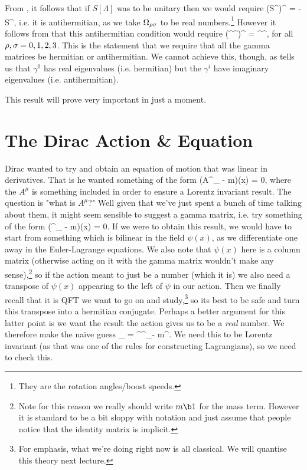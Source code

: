 \bq 
    From , it follows that if $S[\Lambda]$ was to be unitary then we would require 
    \bse 
        \big(S^{\rho\sig}\big)^{\dagger} = - S^{\rho\sig},
    \ese 
    i.e. it is antihermitian, as we take $\Omega_{\rho\sigma}$ to be real numbers.\footnote{They are the rotation angles/boost speeds.} However it follows from  that this antihermitian condition would require 
    \bse 
        \big(\gamma^{\rho}\gamma^{\sig}\big)^{\dagger} = \gamma^{\sig}\gamma^{\rho},
    \ese 
    for all $\rho,\sigma=0,1,2,3$. This is the statement that we require that all the gamma matrices be hermitian or antihermitian. We cannot achieve this, though, as  tells us that $\gamma^0$ has real eigenvalues (i.e. hermitian) but the $\gamma^i$ have imaginary eigenvalues (i.e. antihermitian). 
\eq 

This result will prove very important in just a moment. 

\section{The Dirac Action \& Equation}

Dirac wanted to try and obtain an equation of motion that was linear in derivatives. That is he wanted something of the form 
\bse 
    (A^{\mu}\p_{\mu} - m)\psi(x) = 0,
\ese
where the $A^{\mu}$ is something included in order to ensure a Lorentz invariant result. The question is "what is $A^{\mu}$?" Well given that we've just spent a bunch of time talking about them, it might seem sensible to suggest a gamma matrix, i.e. try something of the form 
\bse 
    (\gamma^{\mu}\p_{\mu} - m)\psi(x) = 0.
\ese
If we were to obtain this result, we would have to start from something which is bilinear in the field $\psi(x)$, as we differentiate one away in the Euler-Lagrange equations. We also note that $\psi(x)$ here is a column matrix (otherwise acting on it with the gamma matrix wouldn't make any sense),\footnote{Note for this reason we really should write $m\b1$ for the mass term. However it is standard to be a bit sloppy with notation and just assume that people notice that the identity matrix is implicit.} so if the action meant to just be a number (which it is) we also need a transpose of $\psi(x)$ appearing to the left of $\psi$ in our action. Then we finally recall that it is QFT we want to go on and study,\footnote{For emphasis, what we're doing right now is all classical. We will quantise this theory next lecture.} so its best to be safe and turn this transpose into a hermitian conjugate. Perhaps a better argument for this latter point is we want the result the action gives us to be a \textit{real} number. We therefore make the na\"{i}ve guess 
\bse 
    \cL_{} = \psi^{\dagger}\gamma^{\mu}\p_{\mu}\psi - m\psi^{\dagger}\psi. 
\ese 
We need this to be Lorentz invariant (as that was one of the rules for constructing Lagrangians), so we need to check this.

